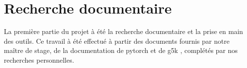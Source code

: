 \section{Recherche documentaire}
La première partie du projet à été la recherche documentaire et la prise en main des outils.
Ce travail à été effectué à partir des documents fournis par notre maître de stage, de la documentation de \gls{pytorch} \autocite{60MinBlitzTorch,ByExampleTorch,Classify,doc_pytorch} et de \gls{g5k} \autocite{DeepLoriaG5k,TutoIbadaG5k}, complétés par nos recherches personnelles.

